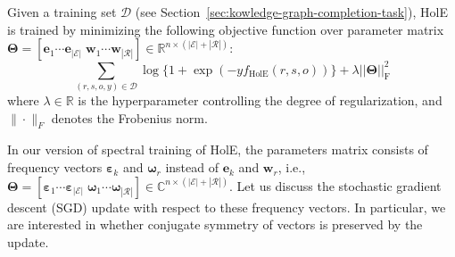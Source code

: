 \documentclass[11pt,a4paper]{article}
\def\mat#1{\boldsymbol{\mathbf{#1}}}
\def\Cset{\mathbb{C}}
\def\Rset{\mathbb{R}}
\begin{document}
Given a training set $\mathcal{D}$ (see Section~\ref{sec:kowledge-graph-completion-task}),
HolE is trained by minimizing the following objective function over
parameter matrix
$\mat{\Theta} = [ \mat{e}_1 \cdots \mat{e}_{|\mathcal{E}|} \; \mat{w}_1 \cdots \mat{w}_{|\mathcal{R}|} ] \in \Rset^{n\times (|\mathcal{E}| + |\mathcal{R}|)}$:
\begin{equation}
  \label{eq:hole-objective}
  \sum_{(r,s,o, y)\in{\mathcal D}} \!\! \log\{1+\exp(-y f_{\text{HolE}}(r,s,o))\}
  + \lambda||\mat{\Theta}||_{\text{F}}^2
\end{equation}
where
$\lambda \in \Rset$ is the hyperparameter controlling the degree of regularization,
and $\|\cdot\|_F$ denotes the Frobenius norm.

In our version of spectral training of HolE,
the parameters matrix consists of frequency vectors $\mat{\varepsilon}_k$ and $\mat{\omega}_r$ instead of $\mat{e}_k$ and $\mat{w}_r$, i.e.,
$\mat{\Theta} = [ \mat{\varepsilon}_1 \cdots \mat{\varepsilon}_{|\mathcal{E}|} \; \mat{\omega}_1 \cdots \mat{\omega}_{|\mathcal{R}|} ] \in \Cset^{n\times (|\mathcal{E}| + |\mathcal{R}|)}$.
Let us discuss the stochastic gradient descent (SGD) update with respect to these frequency vectors.
In particular, we are interested in whether conjugate symmetry of vectors is preserved by the update.
\end{document}
